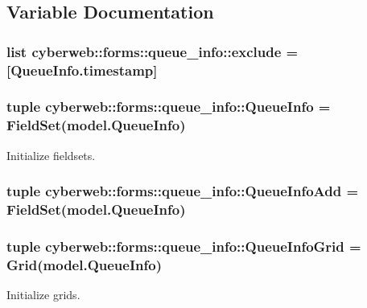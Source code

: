 \subsection{\-Variable \-Documentation}
\hypertarget{namespacecyberweb_1_1forms_1_1queue__info_a0fbb22257d39b53df74d7274cc3524be}{
\subsubsection[{exclude}]{\setlength{\rightskip}{0pt plus 5cm}list {\bf cyberweb\-::forms\-::queue\-\_\-info\-::exclude} = \mbox{[}\-Queue\-Info.\-timestamp\mbox{]}}}\label{namespacecyberweb_1_1forms_1_1queue__info_a0fbb22257d39b53df74d7274cc3524be}
\hypertarget{namespacecyberweb_1_1forms_1_1queue__info_a605db563d4e830522692eda24139a57f}{
\subsubsection[{\-Queue\-Info}]{\setlength{\rightskip}{0pt plus 5cm}tuple {\bf cyberweb\-::forms\-::queue\-\_\-info\-::\-Queue\-Info} = \-Field\-Set(model.\-Queue\-Info)}}\label{namespacecyberweb_1_1forms_1_1queue__info_a605db563d4e830522692eda24139a57f}


\-Initialize fieldsets. 

\hypertarget{namespacecyberweb_1_1forms_1_1queue__info_a433f61c277cb632ece0ccc7bd155a721}{
\subsubsection[{\-Queue\-Info\-Add}]{\setlength{\rightskip}{0pt plus 5cm}tuple {\bf cyberweb\-::forms\-::queue\-\_\-info\-::\-Queue\-Info\-Add} = \-Field\-Set(model.\-Queue\-Info)}}\label{namespacecyberweb_1_1forms_1_1queue__info_a433f61c277cb632ece0ccc7bd155a721}
\hypertarget{namespacecyberweb_1_1forms_1_1queue__info_ab0853d5c5f3e469798f4c25debeb0780}{
\subsubsection[{\-Queue\-Info\-Grid}]{\setlength{\rightskip}{0pt plus 5cm}tuple {\bf cyberweb\-::forms\-::queue\-\_\-info\-::\-Queue\-Info\-Grid} = \-Grid(model.\-Queue\-Info)}}\label{namespacecyberweb_1_1forms_1_1queue__info_ab0853d5c5f3e469798f4c25debeb0780}


\-Initialize grids. 

